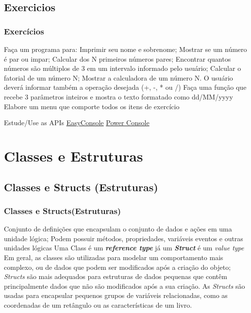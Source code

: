 \documentclass{beamer}
\begin{document}
\subsection{Exercicios}
\begin{frame}[fragile]
\frametitle{Exercícios}
\begin{outline}
	\1 Faça um programa para:
	\2 Imprimir seu nome e sobrenome;
	\2 Mostrar se um número é par ou impar;
	\2 Calcular dos N primeiros números pares;
	\2 Encontrar quantos números são múltiplos de 3 em um intervalo informado pelo usuário;
	\2 Calcular o fatorial de um número N;
	\2 Mostrar a calculadora de um número N. O usuário deverá informar também a operação desejada (+, -, * ou /)
	\1 Faça uma função que recebe 3 parâmetros inteiros e mostra o texto formatado como dd/MM/yyyy
	\1 Elabore um menu que comporte todos os itens de exercício
	\2 []
	\2 []
	
	\1 Estude/Use as APIs
		\2 \href{https://github.com/splttingatms/EasyConsole}{EasyConsole} 
		\2 \href{https://github.com/dejanstojanovic/Power-Console}{Power Console} 
\end{outline}
\end{frame}


\section{Classes e Estruturas}
\subsection{Classes e Structs (Estruturas)}
\begin{frame}
\frametitle{Classes e Structs(Estruturas)}
\begin{outline}
\1 Conjunto de definições que encapsulam o conjunto de dados e ações em uma unidade lógica;
	\2 Podem possuir métodos, propriedades, variáveis eventos e outras unidades lógicas
	\2 Uma Class é um \textit{\textbf{reference type}} já um \textit{\textbf{Struct}} é um \textit{value type}
\1 Em geral, as classes são utilizadas para modelar um comportamento mais complexo, ou de dados que podem ser modificados após a criação do objeto;
\1 \textit{Structs} são mais adequados para estruturas de dados pequenas que contêm principalmente dados que não são modificados após a sua criação.
\1 As \textit{Structs} são usadas para encapsular pequenos grupos de variáveis relacionadas, como as coordenadas de um retângulo ou as características de um livro.
\end{outline}
\end{frame}
\end{document}
